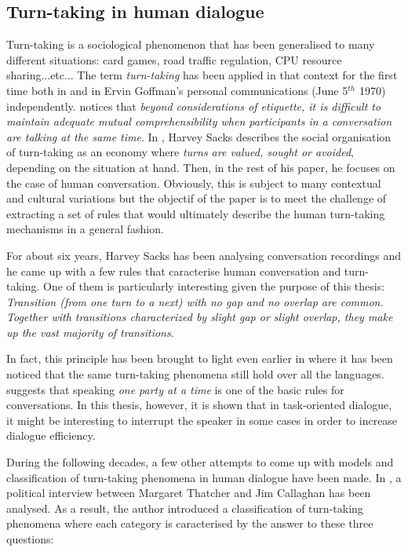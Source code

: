     \subsection{Turn-taking in human dialogue}
    \label{soa:ttphuman}
    
    	Turn-taking is a sociological phenomenon that has been generalised to many different situations: card games, road traffic regulation, CPU resource sharing...etc... The term \textit{turn-taking} has been applied in that context for the first time both in \cite{Yngve1970} and in Ervin Goffman's personal communications (June 5$^{th}$ 1970) independently. \cite{Duncan1972} notices that \textit{beyond considerations of etiquette, it is difficult to maintain adequate mutual comprehensibility when participants in a conversation are talking at the same time}. In \cite{Sacks1974}, Harvey Sacks describes the social organisation of turn-taking as an economy where \textit{turns are valued, sought or avoided}, depending on the situation at hand. Then, in the rest of his paper, he focuses on the case of human conversation. Obviously, this is subject to many contextual and cultural variations but the objectif of the paper is to meet the challenge of extracting a set of rules that would ultimately describe the human turn-taking mechanisms in a general fashion.
        
        For about six years, Harvey Sacks has been analysing conversation recordings and he came up with a few rules that caracterise human conversation and turn-taking. One of them is particularly interesting given the purpose of this thesis: \textit{Transition (from one turn to a next) with no gap and no overlap are common. Together with transitions characterized by slight gap or slight overlap, they make up the vast majority of transitions}.
				
				In fact, this principle has been brought to light even earlier in \cite{Sullivan1947} where it has been noticed that the same turn-taking phenomena still hold over all the languages. \cite{Schegloff1968} suggests that speaking \textit{one party at a time} is one of the basic rules for conversations. In this thesis, however, it is shown that in task-oriented dialogue, it might be interesting to interrupt the speaker in some cases in order to increase dialogue efficiency.
				
				During the following decades, a few other attempts to come up with models and classification of turn-taking phenomena in human dialogue have been made. In \cite{Beattie1982}, a political interview between Margaret Thatcher and Jim Callaghan has been analysed. As a result, the author introduced a classification of turn-taking phenomena where each category is caracterised by the answer to these three questions:
        
